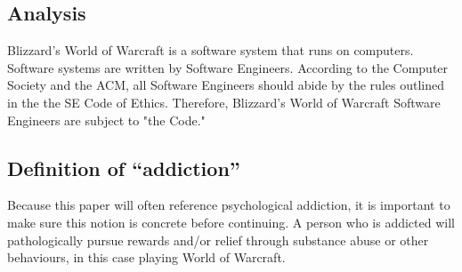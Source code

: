 \documentclass[11pt]{article}
\begin{document}
\begin{multicols}{2}


\section{Analysis}

Blizzard's World of Warcraft is a software system that runs on computers. \cite{WoWSystemReqs} Software systems are written by Software Engineers. \cite{ACMApprovesSECode} According to the Computer Society and the ACM, all Software Engineers should abide by the rules outlined in the the SE Code of Ethics. \cite{ACMApprovesSECode}\cite{SECode} Therefore, Blizzard's World of Warcraft Software Engineers are subject to "the Code." \cite{SECode}

\subsection{Definition of ``addiction''}
Because this paper will often reference psychological addiction, it is important to make sure this notion is concrete before continuing.
A person who is addicted will pathologically pursue rewards and/or relief through substance abuse or other behaviours, in this case playing World of Warcraft. \cite{DefinitionOfAddiction}


\end{multicols}
\end{document}
